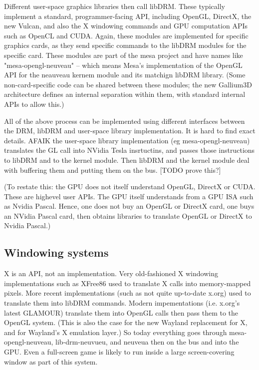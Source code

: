 \documentclass[oneside,english]{scrbook}
\begin{document}
Different user-space graphics libraries then call libDRM.   These typically implement a standard, programmer-facing API, including OpenGL, DirectX, the new Vulcan, and also the X windowing commands and GPU computation APIs such as OpenCL and CUDA.  Again, these modules are implemented for specific graphics cards, as they send specific commands to the libDRM modules for the specific card.  These modules are part of the mesa project and have names like "mesa-opengl-neuveau" -- which means Mesa's implementation of the OpenGL API for the neauveau kernem module and its matchign libDRM library.   (Some non-card-specific code can be shared between these modules; the new Gallium3D architecture defines an internal separation within them, with standard internal APIs to allow this.)

All of the above process can be implemented using different interfaces between the DRM, libDRM and user-space library implementation.   It is hard to find exact details. AFAIK the user-space library implementation (eg mesa-opengl-neuveau) translates the GL call into NVidia Tesla insrtuctins, and passes those instructions to libDRM and to the kernel module. Then libDRM and the kernel module deal with buffering them and putting them on the bus. [TODO prove this?]

(To restate this: the GPU does not itself understand OpenGL, DirectX or CUDA.  These are highevel user APIs. The GPU itself understands from a GPU ISA such as Nvidia Pascal. Hence, one does not buy an OpenGL or DirectX card, one buys an NVidia Pascal card, then obtains libraries to translate OpenGL or DirectX to Nvidia Pascal.)

\subsection{Windowing systems}
X is an API, not an implementation.  Very old-fashioned X windowing implementations such as XFree86 used to translate X calls into memory-mapped pixels.  More recent implementations (such as not quite up-to-date x.org) used to translate them into libDRM commands.   Modern impementations (i.e. x.org's latest GLAMOUR) translate them into OpenGL calls then pass them to the OpenGL system. (This is also the case for the new Wayland replacement for X, and for Wayland's X emulation layer.)  So today everything goes through mesa-opengl-neuveau, lib-drm-neuvueu, and neuveua then on the bus and into the GPU.  Even a full-screen game is likely to run inside a large screen-covering window as part of this system.
\end{document}
